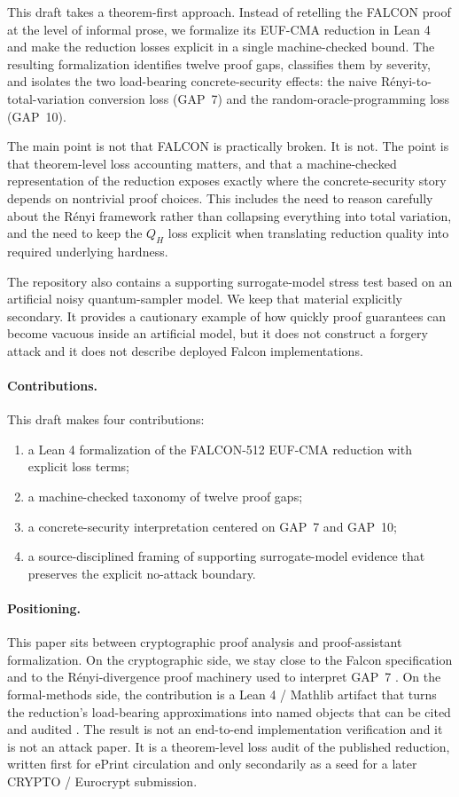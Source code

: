 \documentclass[11pt]{article}
\begin{document}
This draft takes a theorem-first approach. Instead of retelling the FALCON proof at the level of informal prose, we formalize its EUF-CMA reduction in Lean 4 and make the reduction losses explicit in a single machine-checked bound. The resulting formalization identifies twelve proof gaps, classifies them by severity, and isolates the two load-bearing concrete-security effects: the naive R\'{e}nyi-to-total-variation conversion loss (GAP~7) and the random-oracle-programming loss (GAP~10).

The main point is not that FALCON is practically broken. It is not. The point is that theorem-level loss accounting matters, and that a machine-checked representation of the reduction exposes exactly where the concrete-security story depends on nontrivial proof choices. This includes the need to reason carefully about the R\'{e}nyi framework rather than collapsing everything into total variation, and the need to keep the $Q_H$ loss explicit when translating reduction quality into required underlying hardness.

The repository also contains a supporting surrogate-model stress test based on an artificial noisy quantum-sampler model. We keep that material explicitly secondary. It provides a cautionary example of how quickly proof guarantees can become vacuous inside an artificial model, but it does not construct a forgery attack and it does not describe deployed Falcon implementations.

\paragraph{Contributions.}
This draft makes four contributions:
\begin{enumerate}
\item a Lean 4 formalization of the FALCON-512 EUF-CMA reduction with explicit loss terms;
\item a machine-checked taxonomy of twelve proof gaps;
\item a concrete-security interpretation centered on GAP~7 and GAP~10;
\item a source-disciplined framing of supporting surrogate-model evidence that preserves the explicit no-attack boundary.
\end{enumerate}

\paragraph{Positioning.}
This paper sits between cryptographic proof analysis and proof-assistant formalization. On the cryptographic side, we stay close to the Falcon specification and to the R\'{e}nyi-divergence proof machinery used to interpret GAP~7 \cite{falconSpec,baiRenyi,prestRenyi}. On the formal-methods side, the contribution is a Lean 4 / Mathlib artifact that turns the reduction's load-bearing approximations into named objects that can be cited and audited \cite{lean4,mathlib}. The result is not an end-to-end implementation verification and it is not an attack paper. It is a theorem-level loss audit of the published reduction, written first for ePrint circulation and only secondarily as a seed for a later CRYPTO / Eurocrypt submission.
\end{document}
